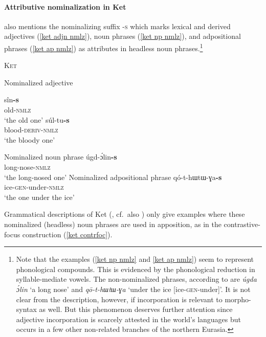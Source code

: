\paragraph{Attributive nominalization in Ket}
\citet[15, 84–85]{vajda2004} also mentions the nominalizing suffix \textsc{-s} which marks lexical and derived adjectives (\ref{ket adjn nmlz}), noun phrases (\ref{ket np nmlz}), and adpositional phrases (\ref{ket ap nmlz}) as attributes in headless noun phrases.\footnote{Note that the examples (\ref{ket np nmlz} and \ref{ket ap nmlz}) seem to represent phonological compounds. This is evidenced by the phonological reduction in syllable-mediate vowels. The non-nominalized phrases, according to \citet{vajda2005} are \textit{úgda ɔ́lin} ‘a long nose’ and \textit{qō-t-hɯtɯ-ɣa} ‘under the ice [ice-\textsc{gen}-under]’. It is not clear from the description, however, if incorporation is relevant to morpho-syntax as well. But this phenomenon deserves further attention since adjective incorporation is scarcely attested in the world's languages but occurs in a few other non-related branches of the northern Eurasia.}
\begin{exe}
\ex \textsc{Ket} \citep{vajda2005}
\begin{xlist}
\ex Nominalized adjective \label{ket adjn nmlz}
\begin{xlist}
\ex	
\gll	sîn\textbf{-s}\\
	old-\textsc{nmlz}\\
\glt	‘the old one’
\ex	
\gll	súl-tu\textbf{-s}\\
	blood-\textsc{deriv-nmlz}\\
\glt	‘the bloody one’
\end{xlist}
\ex	Nominalized noun phrase \label{ket np nmlz}
\gll	úgd-ɔ́lin\textbf{-s}\\
	long-nose-\textsc{nmlz}\\
\glt	‘the long-nosed one’
\ex Nominalized adpositional phrase \label{ket ap nmlz}
\gll	qó-t-{hɯtɯ-ɣa}\textbf{-s}\\
	ice-\textsc{gen}-under-\textsc{nmlz}\\
\glt	‘the one under the ice’
\end{xlist}
\end{exe}
Grammatical descriptions of Ket (\citealt{vajda2004}, cf.~also \citealt{krukova2007}) only give examples where these nominalized (headless) noun phrases are used in apposition, as in the contrastive-focus construction (\ref{ket contrfoc}). 
